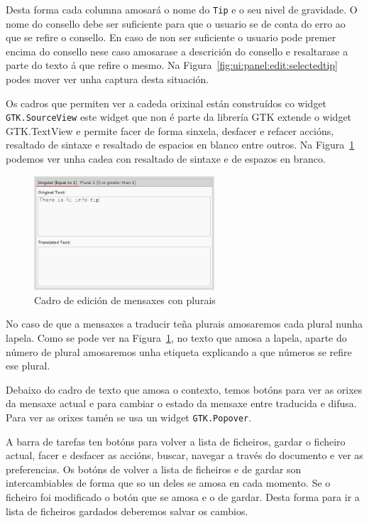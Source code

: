 Desta forma cada columna amosará o nome do \lstinline{Tip} e o seu nivel de gravidade. O nome do consello debe ser suficiente para que o usuario se de conta do erro ao que se refire o consello. En caso de non ser suficiente o usuario pode premer encima do consello nese caso amosarase a descrición do consello e resaltarase a parte do texto á que refire o mesmo. Na Figura~\ref{fig:ui:panel:edit:selectedtip} podes mover ver unha captura desta situación.

Os cadros que permiten ver a cadeda orixinal están construídos co widget \lstinline{GTK.SourceView} este widget que non é parte da librería GTK extende o widget GTK.TextView e permite facer de forma sinxela, desfacer e refacer accións, resaltado de sintaxe e resaltado de espacios en blanco entre outros. Na Figura~\ref{fig:ui:panel:edit:pluralbox} podemos ver unha cadea con resaltado de sintaxe e de espazos en branco.

\begin{figure}[h!]
    \centering
    \includegraphics[width=0.6\textwidth]{img/editbox.png}
    \caption{Cadro de edición de mensaxes con plurais}
    \label{fig:ui:panel:edit:pluralbox}
\end{figure}

No caso de que a mensaxes a traducir teña plurais amosaremos cada plural nunha lapela. Como se pode ver na Figura~\ref{fig:ui:panel:edit:pluralbox}, no texto que amosa a lapela, aparte do número de plural amosaremos unha etiqueta explicando a que números se refire ese plural.

Debaixo do cadro de texto que amosa o contexto, temos botóns para ver as orixes da mensaxe actual e para cambiar o estado da mensaxe entre traducida e difusa. Para ver as orixes tamén se usa un widget \lstinline{GTK.Popover}.

A barra de tarefas ten botóns para volver a lista de ficheiros, gardar o ficheiro actual, facer e desfacer as accións, buscar, navegar a través do documento e ver as preferencias. Os botóns de volver a lista de ficheiros e de gardar son intercambiables de forma que so un deles se amosa en cada momento. Se o ficheiro foi modificado o botón que se amosa e o de gardar. Desta forma para ir a lista de ficheiros gardados deberemos salvar os cambios.


